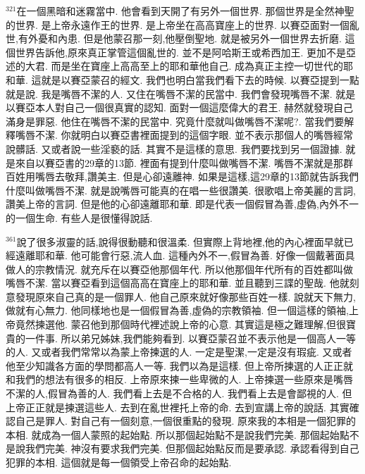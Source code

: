 \documentclass{book}
\begin{document}
$^{321}$在一個黑暗和迷霧當中.
他會看到天開了有另外一個世界.
那個世界是全然神聖的世界.
是上帝永遠作王的世界.
是上帝坐在高高寶座上的世界.
以賽亞面對一個亂世,有外憂和內患.
但是他蒙召那一刻,他壓倒聖地.
就是被另外一個世界去折磨.
這個世界告訴他,原來真正掌管這個亂世的.
並不是阿哈斯王或希西加王.
更加不是亞述的大君.
而是坐在寶座上高高至上的耶和華他自己.
成為真正主控一切世代的耶和華.
這就是以賽亞蒙召的經文.
我們也明白當我們看下去的時候.
以賽亞提到一點就是說.
我是嘴唇不潔的人.
又住在嘴唇不潔的民當中.
我們會發現嘴唇不潔.
就是以賽亞本人對自己一個很真實的認知.
面對一個這麼偉大的君王.
赫然就發現自己滿身是罪惡.
他住在嘴唇不潔的民當中.
究竟什麼就叫做嘴唇不潔呢?.
當我們要解釋嘴唇不潔.
你就明白以賽亞書裡面提到的這個字眼.
並不表示那個人的嘴唇經常說髒話.
又或者說一些淫褻的話.
其實不是這樣的意思.
我們要找到另一個證據.
就是來自以賽亞書的29章的13節.
裡面有提到什麼叫做嘴唇不潔.
嘴唇不潔就是那群百姓用嘴唇去敬拜,讚美主.
但是心卻遠離神.
如果是這樣,這29章的13節就告訴我們什麼叫做嘴唇不潔.
就是說嘴唇可能真的在唱一些很讚美.
很歌唱上帝美麗的言詞,讚美上帝的言詞.
但是他的心卻遠離耶和華.
即是代表一個假冒為善,虛偽,內外不一的一個生命.
有些人是很懂得說話.

$^{361}$說了很多淑靈的話,說得很動聽和很溫柔.
但實際上背地裡,他的內心裡面早就已經遠離耶和華.
他可能會行惡,流人血.
這種內外不一,假冒為善.
好像一個戴著面具做人的宗教情況.
就充斥在以賽亞他那個年代.
所以他那個年代所有的百姓都叫做嘴唇不潔.
當以賽亞看到這個高高在寶座上的耶和華.
並且聽到三諜的聖哉.
他就刻意發現原來自己真的是一個罪人.
他自己原來就好像那些百姓一樣.
說就天下無力,做就有心無力.
他同樣地也是一個假冒為善,虛偽的宗教領袖.
但一個這樣的領袖,上帝竟然揀選他.
蒙召他到那個時代裡述說上帝的心意.
其實這是極之難理解,但很寶貴的一件事.
所以弟兄姊妹,我們能夠看到.
以賽亞蒙召並不表示他是一個高人一等的人.
又或者我們常常以為蒙上帝揀選的人.
一定是聖潔,一定是沒有瑕疵.
又或者他至少知識各方面的學問都高人一等.
我們以為是這樣.
但上帝所揀選的人正正就和我們的想法有很多的相反.
上帝原來揀一些卑微的人.
上帝揀選一些原來是嘴唇不潔的人,假冒為善的人.
我們看上去是不合格的人.
我們看上去是會鄙視的人.
但上帝正正就是揀選這些人.
去到在亂世裡托上帝的命.
去到宣講上帝的說話.
其實確認自己是罪人.
對自己有一個刻意,一個很重點的發現.
原來我的本相是一個犯罪的本相.
就成為一個人蒙照的起始點.
所以那個起始點不是說我們完美.
那個起始點不是說我們完美.
神沒有要求我們完美.
但那個起始點反而是要承認.
承認看得到自己犯罪的本相.
這個就是每一個領受上帝召命的起始點.
\end{document}
